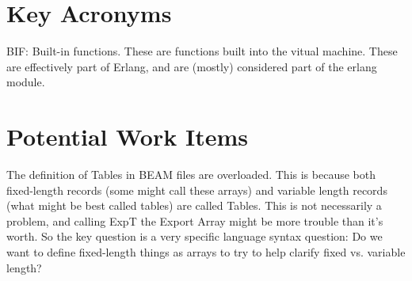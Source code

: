 \documentclass{article}
\begin{document}
\section{Key Acronyms}

BIF: Built-in functions.  These are functions built into the vitual machine.  These
are effectively part of Erlang, and are (mostly) considered part of the erlang module.

\section{Potential Work Items}

The definition of Tables in BEAM files are overloaded.  This is because both fixed-length 
records (some might call these arrays) and variable length records (what might be best called
tables) are called Tables.  This is not necessarily a problem, and calling ExpT the Export
Array might be more trouble than it's worth.  So the key question is a very specific language
syntax question: Do we want to define fixed-length things as arrays to try to help clarify
fixed vs. variable length?
\end{document}
